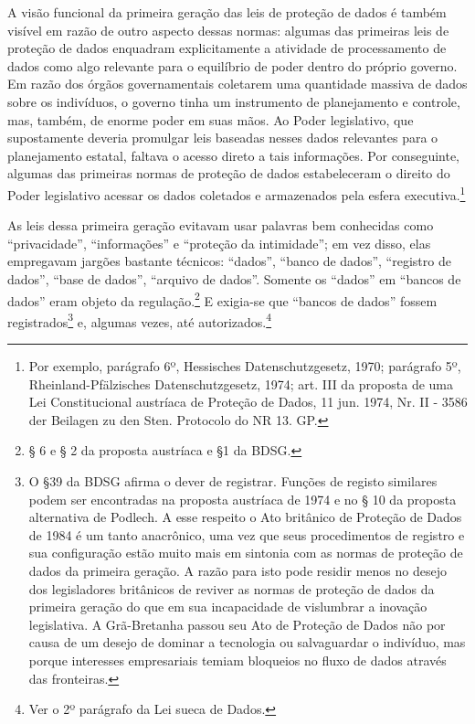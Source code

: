 A visão funcional da primeira geração das leis de proteção de dados é
também visível em razão de outro aspecto dessas normas: algumas das
primeiras leis de proteção de dados enquadram explicitamente a atividade
de processamento de dados como algo relevante para o equilíbrio de poder
dentro do próprio governo. Em razão dos órgãos governamentais coletarem
uma quantidade massiva de dados sobre os indivíduos, o governo tinha um
instrumento de planejamento e controle, mas, também, de enorme poder em
suas mãos. Ao Poder legislativo, que supostamente deveria promulgar leis
baseadas nesses dados relevantes para o planejamento estatal, faltava o
acesso direto a tais informações. Por conseguinte, algumas das primeiras
normas de proteção de dados estabeleceram o direito do Poder legislativo
acessar os dados coletados e armazenados pela esfera
executiva.\footnote{Por exemplo, parágrafo 6º, Hessisches
  Datenschutzgesetz, 1970; parágrafo 5º, Rheinland-Pfälzisches
  Datenschutzgesetz, 1974; art. III da proposta de uma Lei
  Constitucional austríaca de Proteção de Dados, 11 jun. 1974, Nr. II -
  3586 der Beilagen zu den Sten. Protocolo do NR 13. GP.}

As leis dessa primeira geração evitavam usar palavras bem conhecidas
como ``privacidade'', ``informações'' e ``proteção da intimidade''; em
vez disso, elas empregavam jargões bastante técnicos: ``dados'', ``banco
de dados'', ``registro de dados'', ``base de dados'', ``arquivo de
dados''. Somente os ``dados'' em ``bancos de dados'' eram objeto da
regulação.\footnote{§ 6 e § 2 da proposta austríaca e §1 da BDSG.} E
exigia-se que ``bancos de dados'' fossem registrados\footnote{O §39 da
  BDSG afirma o dever de registrar. Funções de registo similares podem
  ser encontradas na proposta austríaca de 1974 e no § 10 da proposta
  alternativa de Podlech. A esse respeito o Ato britânico de Proteção de
  Dados de 1984 é um tanto anacrônico, uma vez que seus procedimentos de
  registro e sua configuração estão muito mais em sintonia com as normas
  de proteção de dados da primeira geração. A razão para isto pode
  residir menos no desejo dos legisladores britânicos de reviver as
  normas de proteção de dados da primeira geração do que em sua
  incapacidade de vislumbrar a inovação legislativa. A Grã-Bretanha
  passou seu Ato de Proteção de Dados não por causa de um desejo de
  dominar a tecnologia ou salvaguardar o indivíduo, mas porque
  interesses empresariais temiam bloqueios no fluxo de dados através das
  fronteiras.} e, algumas vezes, até autorizados.\footnote{Ver o 2º
  parágrafo da Lei sueca de Dados.}

